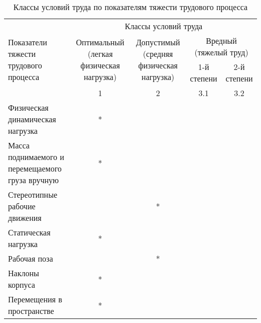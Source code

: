 \begin{table}[ht]
    \centering
    \renewcommand{\arraystretch}{1.5}
    \begin{tabular}{|p{3.5cm}|c|c|c|c|}
        \hline
        \multirow{4}{3.5cm}{Показатели тяжести трудового процесса}
        & \multicolumn{4}{c|}{Классы условий труда}                                 \\ \cline{2-5}

        & \multirow{2}{3.8cm}{Оптимальный (легкая физическая нагрузка)}
        & \multirow{2}{3.8cm}{Допустимый (средняя физическая нагрузка)}
        & \multicolumn{2}{c|}{Вредный (тяжелый труд)}                               \\ \cline{4-5}

        & &                                          & 1-й степени & 2-й степени    \\ \cline{2-5}

                                                            & 1 & 2 & 3.1   & 3.2   \\ \hline

        Физическая динамическая нагрузка                    & * &   &       &       \\[1ex] \hline
        Масса поднимаемого и перемещаемого груза вручную    & * &   &       &       \\[1ex] \hline
        Стереотипные рабочие движения                       &   & * &       &       \\[1ex] \hline
        Статическая нагрузка                                & * &   &       &       \\[1ex] \hline
        Рабочая поза                                        &   & * &       &       \\[1ex] \hline
        Наклоны корпуса                                     & * &   &       &       \\[1ex] \hline
        Перемещения в пространстве                          & * &   &       &       \\[1ex] \hline
    \end{tabular}
    \caption{Классы условий труда по показателям тяжести трудового процесса}
    \label{labor_classes_by_work_process_difficulty_tbl}
\end{table}
